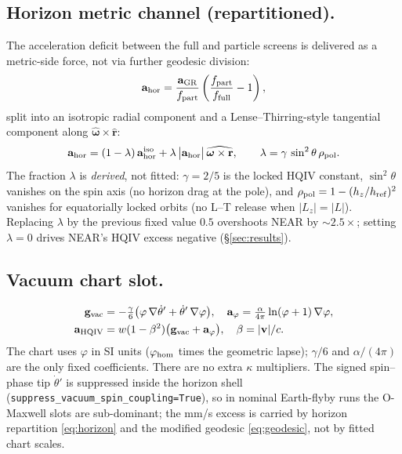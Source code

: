 \documentclass[11pt]{amsart}
\begin{document}
\subsection{Horizon metric channel (repartitioned).}
The acceleration deficit between the full and particle screens is delivered as a metric-side
force, not via further geodesic division:
\begin{equation}\label{eq:horizon}
\mathbf a_{\rm hor} = \frac{\mathbf a_{\rm GR}}{f_{\rm part}}
  \left(\frac{f_{\rm part}}{f_{\rm full}}-1\right),
\end{equation}
split into an isotropic radial component and a Lense--Thirring-style tangential component
along $\hat{\boldsymbol\omega}\times\hat{\mathbf r}$:
\begin{equation}\label{eq:lambda}
\mathbf a_{\rm hor} = (1-\lambda)\,\mathbf a_{\rm hor}^{\rm iso}
  + \lambda\,\bigl|\mathbf a_{\rm hor}\bigr|\,
  \widehat{\boldsymbol\omega\times\mathbf r},\qquad
\lambda = \gamma\,\sin^2\theta\,\rho_{\rm pol}.
\end{equation}
The fraction $\lambda$ is \emph{derived}, not fitted: $\gamma=2/5$ is the locked HQIV
constant, $\sin^2\theta$ vanishes on the spin axis (no horizon drag at the pole), and
$\rho_{\rm pol}=1-(h_z/h_{\rm ref})^2$ vanishes for equatorially locked orbits (no L--T
release when $|L_z|=|L|$). Replacing $\lambda$ by the previous fixed value $0.5$ overshoots
NEAR by $\sim 2.5\times$; setting $\lambda=0$ drives NEAR's HQIV excess negative
(\S\ref{sec:results}).

\subsection{Vacuum chart slot.}
\begin{align}
\mathbf g_{\rm vac} &= -\tfrac{\gamma}{6}\bigl(\varphi\,\nabla\dot\theta'
  +\dot\theta'\,\nabla\varphi\bigr),\quad
\mathbf a_\varphi = \tfrac{\alpha}{4\pi}\ln(\varphi+1)\,\nabla\varphi,\\
\mathbf a_{\rm HQIV} &= w(1-\beta^2)\bigl(\mathbf g_{\rm vac}+\mathbf a_\varphi\bigr),
  \quad \beta=|\mathbf v|/c.
\end{align}
The chart uses $\varphi$ in SI units ($\varphi_{\rm hom}$ times the geometric lapse);
$\gamma/6$ and $\alpha/(4\pi)$ are the only fixed coefficients. There are no extra
$\kappa$ multipliers. The signed spin--phase tip $\dot\theta'$ is suppressed inside the
horizon shell (\texttt{suppress\_vacuum\_spin\_coupling=True}), so in nominal Earth-flyby
runs the O-Maxwell slots are sub-dominant; the mm/s excess is carried by horizon
repartition \eqref{eq:horizon} and the modified geodesic \eqref{eq:geodesic}, not by
fitted chart scales.
\end{document}
